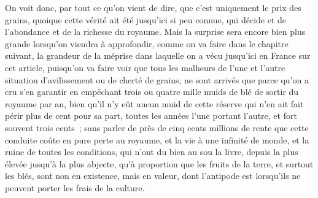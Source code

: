 \documentclass[french,twoside]{book} %
\begin{document}
On voit donc, par tout ce qu’on vient de dire, que c’est uniquement le prix des grains, quoique cette vérité ait été jusqu’ici si peu connue, qui décide et de l’abondance et de la richesse du royaume. Mais la surprise sera encore bien plus grande lorsqu’on viendra à approfondir, comme on va faire dans le chapitre suivant, la grandeur de la méprise dans laquelle on a vécu jusqu’ici en France sur cet article, puisqu’on va faire voir que tous les malheurs de l’une et l’autre situation d’avilissement ou de cherté de grains, ne sont arrivés que parce qu’on a cru s’en garantir en empêchant trois ou quatre mille muids de blé de sortir du royaume par an, bien qu’il n’y eût aucun muid de cette réserve qui n’en ait fait périr plus de cent pour sa part, toutes les années l’une portant l’autre, et fort souvent trois cents ; sans parler de près de cinq cents millions de rente que cette conduite coûte en pure perte au royaume, et la vie à une infinité de monde, et la ruine de toutes les conditions, qui n’ont du bien au sou la livre, depuis la plus élevée jusqu’à la plus abjecte, qu’à proportion que les fruits de la terre, et surtout les blés, sont non en existence, mais en valeur, dont l’antipode est lorsqu’ils ne peuvent porter les frais de la culture.
\end{document}
